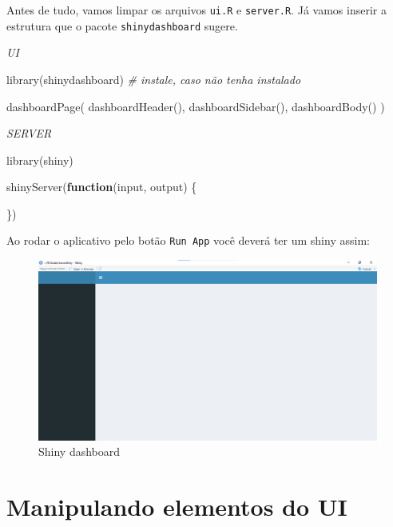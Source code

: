 \documentclass[
]{book}
\newenvironment{Shaded}{\begin{snugshade}}{\end{snugshade}}
\newcommand{\CommentTok}[1]{\textcolor[rgb]{0.56,0.35,0.01}{\textit{#1}}}
\newcommand{\ControlFlowTok}[1]{\textcolor[rgb]{0.13,0.29,0.53}{\textbf{#1}}}
\newcommand{\FunctionTok}[1]{\textcolor[rgb]{0.00,0.00,0.00}{#1}}
\newcommand{\NormalTok}[1]{#1}
\begin{document}
Antes de tudo, vamos limpar os arquivos \texttt{ui.R} e \texttt{server.R}. Já vamos inserir a estrutura que o pacote \texttt{shinydashboard} sugere.

\emph{UI}

\begin{Shaded}
\begin{Highlighting}[]
\FunctionTok{library}\NormalTok{(shinydashboard) }\CommentTok{\# instale, caso não tenha instalado}

\FunctionTok{dashboardPage}\NormalTok{(}
  \FunctionTok{dashboardHeader}\NormalTok{(),}
  \FunctionTok{dashboardSidebar}\NormalTok{(),}
  \FunctionTok{dashboardBody}\NormalTok{()}
\NormalTok{)}
\end{Highlighting}
\end{Shaded}

\emph{SERVER}

\begin{Shaded}
\begin{Highlighting}[]
\FunctionTok{library}\NormalTok{(shiny)}

\FunctionTok{shinyServer}\NormalTok{(}\ControlFlowTok{function}\NormalTok{(input, output) \{}

\NormalTok{\})}
\end{Highlighting}
\end{Shaded}

Ao rodar o aplicativo pelo botão \texttt{Run\ App} você deverá ter um shiny assim:

\begin{figure}
\centering
\includegraphics{./imagens/cap10imagem6.png}
\caption{Shiny dashboard}
\end{figure}

\hypertarget{manipulando-elementos-do-ui}{%
\section{Manipulando elementos do UI}\label{manipulando-elementos-do-ui}}
\end{document}
